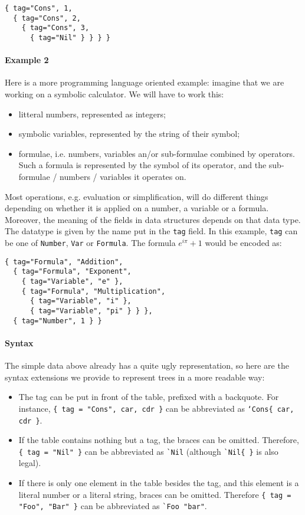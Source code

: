 \begin{verbatim}
{ tag="Cons", 1, 
  { tag="Cons", 2, 
    { tag="Cons", 3, 
      { tag="Nil" } } } }
\end{verbatim}

\paragraph{Example 2}

Here is a more programming language oriented example: imagine that we
are working on a symbolic calculator. We will have to work this:
\begin{itemize}
\item litteral numbers, represented as integers;
\item symbolic variables, represented by the string of their
  symbol;
\item formulae, i.e. numbers, variables an/or sub-formulae
  combined by operators. Such a formula is represented by the symbol
  of its operator, and the sub-formulae / numbers / variables it
  operates on.
\end{itemize}
Most operations, e.g. evaluation or simplification, will do different
things depending on whether it is applied on a number, a variable or a
formula. Moreover, the meaning of the fields in data structures depends
on that data type. The datatype is given by the name put in the
\verb+tag+ field. In this example, \verb+tag+ can be one of
\verb+Number+, \verb+Var+ or \verb+Formula+. The formula $e^{i\pi}+1$
would be encoded as:
\begin{verbatim}
{ tag="Formula", "Addition", 
  { tag="Formula", "Exponent", 
    { tag="Variable", "e" },
    { tag="Formula", "Multiplication", 
      { tag="Variable", "i" },
      { tag="Variable", "pi" } } },
  { tag="Number", 1 } }
\end{verbatim}

\paragraph{Syntax}

The simple data above already has a quite ugly representation, so here
are the syntax extensions we provide to represent trees in a more
readable way:

\begin{itemize}
\item The tag can be put in front of the table, prefixed with a
  backquote. For instance, {\tt\{ tag = "Cons", car, cdr \}} can be
  abbreviated as {\tt`Cons\{ car, cdr \}}.
\item If the table contains nothing but a tag, the braces can be
  omitted. Therefore, \verb+{ tag = "Nil" }+ can be abbreviated as
  \verb+`Nil+ (although \verb|`Nil{ }| is also legal).
\item If there is only one element in the table besides the tag, and
  this element is a literal number or a literal string, braces can be
  omitted. Therefore {\tt\{ tag = "Foo", "Bar" \}} can be abbreviated
  as \verb+`Foo "bar"+.
\end{itemize}

